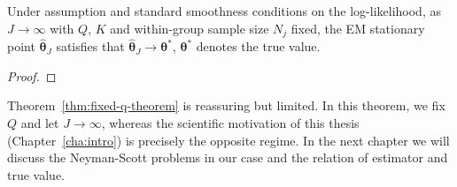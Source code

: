 \begin{theorem}
    Under assumption and standard smoothness conditions on the log-likelihood, as $J\to\infty$ with $Q$, $K$ and within-group sample size $N_{j}$ fixed, the EM stationary point $\hat{\bm{\theta}}_{J}$ satisfies that $\hat{\bm{\theta}}_{J}\to \bm{\theta}^{*}$, $\bm{\theta}^{*}$ denotes the true value.
    \label{thm:fixed-q-theorem}
\end{theorem}

\begin{proof}
    
\end{proof}

Theorem~\ref{thm:fixed-q-theorem} is reassuring but limited. In this theorem, we fix $Q$ and let $J\to\infty$, whereas the scientific motivation of this thesis (Chapter~\ref{cha:intro}) is precisely the opposite regime. In the next chapter we will discuss the Neyman-Scott problems in our case and the relation of estimator and true value.

\fi


